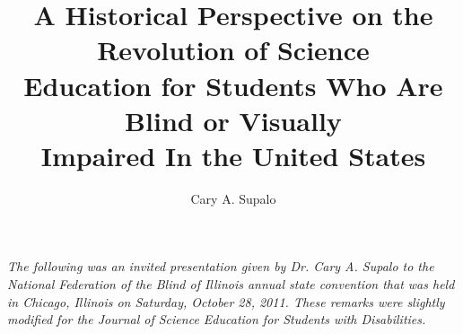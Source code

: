 \documentclass[11.5pt]{sig-alternate} %
\makeatletter
\let\oldabstract\abstract
\let\oldendabstract\endabstract
\renewenvironment{abstract} %
{\renewenvironment{quotation}%
               {\list{}{\addtolength{\leftmargin}{1em} %
                        \listparindent 1.5em%
                        \itemindent    \listparindent%
                        \rightmargin   \leftmargin%
                        \parsep        \z@ \@plus\p@}%
                \item\relax}%
               {\endlist}%
\oldabstract}
{\oldendabstract}
\makeatother
\begin{document}
\title{A Historical Perspective on the Revolution of Science\\Education for Students Who Are Blind or Visually\\Impaired In the United States}

\author[1]{\large \color{blue} Cary A. Supalo}


\toappear{}
\maketitle
\begin{@twocolumnfalse} 
\begin{abstract}
\item 
\textit{The following was an invited presentation given by Dr. Cary A. Supalo to the National
Federation of the Blind of Illinois annual state convention that was held in Chicago, Illinois
on Saturday, October 28, 2011. These remarks were slightly modified for the Journal of Science
Education for Students with Disabilities.}
\\ \\  
\end{abstract}
\end{@twocolumnfalse}

\end{document}
